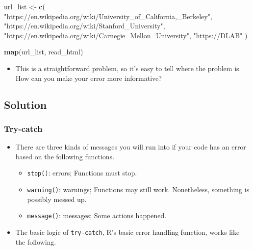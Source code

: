 \documentclass[
]{book}
\newenvironment{Shaded}{\begin{snugshade}}{\end{snugshade}}
\newcommand{\KeywordTok}[1]{\textcolor[rgb]{0.13,0.29,0.53}{\textbf{#1}}}
\newcommand{\NormalTok}[1]{#1}
\newcommand{\StringTok}[1]{\textcolor[rgb]{0.31,0.60,0.02}{#1}}
\providecommand{\tightlist}{%
  \setlength{\itemsep}{0pt}\setlength{\parskip}{0pt}}
\begin{document}
\begin{Shaded}
\begin{Highlighting}[]
\NormalTok{url\_list \textless{}{-}}\StringTok{ }\KeywordTok{c}\NormalTok{(}
  \StringTok{"https://en.wikipedia.org/wiki/University\_of\_California,\_Berkeley"}\NormalTok{,}
  \StringTok{"https://en.wikipedia.org/wiki/Stanford\_University"}\NormalTok{,}
  \StringTok{"https://en.wikipedia.org/wiki/Carnegie\_Mellon\_University"}\NormalTok{,}
  \StringTok{"https://DLAB"}
\NormalTok{)}
\end{Highlighting}
\end{Shaded}

\begin{Shaded}
\begin{Highlighting}[]
\KeywordTok{map}\NormalTok{(url\_list, read\_html)}
\end{Highlighting}
\end{Shaded}

\begin{itemize}
\tightlist
\item
  This is a straightforward problem, so it's easy to tell where the problem is. How can you make your error more informative?
\end{itemize}

\hypertarget{solution-1}{%
\subsection{Solution}\label{solution-1}}

\hypertarget{try-catch}{%
\subsubsection{Try-catch}\label{try-catch}}

\begin{itemize}
\item
  There are three kinds of messages you will run into if your code has an error based on the following functions.

  \begin{itemize}
  \tightlist
  \item
    \texttt{stop()}: errors; Functions must stop.
  \item
    \texttt{warning()}: warnings; Functions may still work. Nonetheless, something is possibly messed up.
  \item
    \texttt{message()}: messages; Some actions happened.
  \end{itemize}
\item
  The basic logic of \texttt{try-catch}, R's basic error handling function, works like the following.
\end{itemize}
\end{document}

